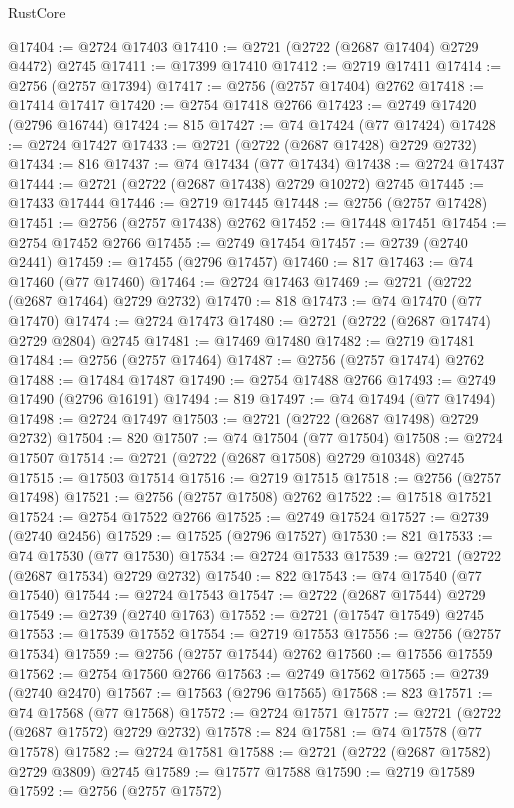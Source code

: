 \begin{lexlean}{RustCore}
\begin{coremodule}
@17404 := @2724 @17403
@17410 := @2721 (@2722 (@2687 @17404) @2729 @4472) @2745
@17411 := @17399 @17410
@17412 := @2719 @17411
@17414 := @2756 (@2757 @17394)
@17417 := @2756 (@2757 @17404) @2762
@17418 := @17414 @17417
@17420 := @2754 @17418 @2766
@17423 := @2749 @17420 (@2796 @16744)
@17424 := 815
@17427 := @74 @17424 (@77 @17424)
@17428 := @2724 @17427
@17433 := @2721 (@2722 (@2687 @17428) @2729 @2732)
@17434 := 816
@17437 := @74 @17434 (@77 @17434)
@17438 := @2724 @17437
@17444 := @2721 (@2722 (@2687 @17438) @2729 @10272) @2745
@17445 := @17433 @17444
@17446 := @2719 @17445
@17448 := @2756 (@2757 @17428)
@17451 := @2756 (@2757 @17438) @2762
@17452 := @17448 @17451
@17454 := @2754 @17452 @2766
@17455 := @2749 @17454
@17457 := @2739 (@2740 @2441)
@17459 := @17455 (@2796 @17457)
@17460 := 817
@17463 := @74 @17460 (@77 @17460)
@17464 := @2724 @17463
@17469 := @2721 (@2722 (@2687 @17464) @2729 @2732)
@17470 := 818
@17473 := @74 @17470 (@77 @17470)
@17474 := @2724 @17473
@17480 := @2721 (@2722 (@2687 @17474) @2729 @2804) @2745
@17481 := @17469 @17480
@17482 := @2719 @17481
@17484 := @2756 (@2757 @17464)
@17487 := @2756 (@2757 @17474) @2762
@17488 := @17484 @17487
@17490 := @2754 @17488 @2766
@17493 := @2749 @17490 (@2796 @16191)
@17494 := 819
@17497 := @74 @17494 (@77 @17494)
@17498 := @2724 @17497
@17503 := @2721 (@2722 (@2687 @17498) @2729 @2732)
@17504 := 820
@17507 := @74 @17504 (@77 @17504)
@17508 := @2724 @17507
@17514 := @2721 (@2722 (@2687 @17508) @2729 @10348) @2745
@17515 := @17503 @17514
@17516 := @2719 @17515
@17518 := @2756 (@2757 @17498)
@17521 := @2756 (@2757 @17508) @2762
@17522 := @17518 @17521
@17524 := @2754 @17522 @2766
@17525 := @2749 @17524
@17527 := @2739 (@2740 @2456)
@17529 := @17525 (@2796 @17527)
@17530 := 821
@17533 := @74 @17530 (@77 @17530)
@17534 := @2724 @17533
@17539 := @2721 (@2722 (@2687 @17534) @2729 @2732)
@17540 := 822
@17543 := @74 @17540 (@77 @17540)
@17544 := @2724 @17543
@17547 := @2722 (@2687 @17544) @2729
@17549 := @2739 (@2740 @1763)
@17552 := @2721 (@17547 @17549) @2745
@17553 := @17539 @17552
@17554 := @2719 @17553
@17556 := @2756 (@2757 @17534)
@17559 := @2756 (@2757 @17544) @2762
@17560 := @17556 @17559
@17562 := @2754 @17560 @2766
@17563 := @2749 @17562
@17565 := @2739 (@2740 @2470)
@17567 := @17563 (@2796 @17565)
@17568 := 823
@17571 := @74 @17568 (@77 @17568)
@17572 := @2724 @17571
@17577 := @2721 (@2722 (@2687 @17572) @2729 @2732)
@17578 := 824
@17581 := @74 @17578 (@77 @17578)
@17582 := @2724 @17581
@17588 := @2721 (@2722 (@2687 @17582) @2729 @3809) @2745
@17589 := @17577 @17588
@17590 := @2719 @17589
@17592 := @2756 (@2757 @17572)

\end{coremodule}
\end{lexlean}
